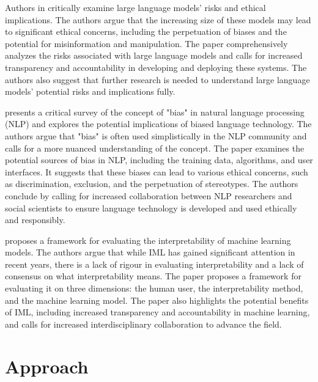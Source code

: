 \documentclass{article}
\begin{document}
Authors in \cite{chatterjee2022inclination} critically examine large language models' risks and ethical implications. The authors argue that the increasing size of these models may lead to significant ethical concerns, including the perpetuation of biases and the potential for misinformation and manipulation. The paper comprehensively analyzes the risks associated with large language models and calls for increased transparency and accountability in developing and deploying these systems. The authors also suggest that further research is needed to understand large language models' potential risks and implications fully.

\cite{ahmed2022role} presents a critical survey of the concept of "bias" in natural language processing (NLP) and explores the potential implications of biased language technology. The authors argue that "bias" is often used simplistically in the NLP community and calls for a more nuanced understanding of the concept. The paper examines the potential sources of bias in NLP, including the training data, algorithms, and user interfaces. It suggests that these biases can lead to various ethical concerns, such as discrimination, exclusion, and the perpetuation of stereotypes. The authors conclude by calling for increased collaboration between NLP researchers and social scientists to ensure language technology is developed and used ethically and responsibly.

\cite{deshpande2020mitigating} proposes a framework for evaluating the interpretability of machine learning models. The authors argue that while IML has gained significant attention in recent years, there is a lack of rigour in evaluating interpretability and a lack of consensus on what interpretability means. The paper proposes a framework for evaluating it on three dimensions: the human user, the interpretability method, and the machine learning model. The paper also highlights the potential benefits of IML, including increased transparency and accountability in machine learning, and calls for increased interdisciplinary collaboration to advance the field.


\section{Approach}
\end{document}
